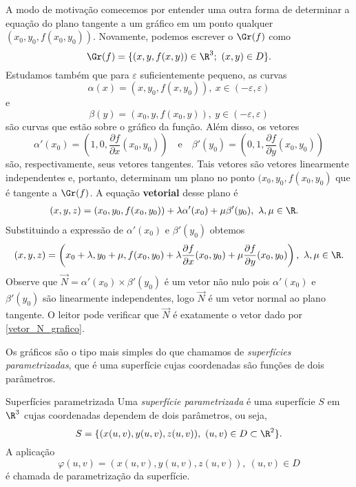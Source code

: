 A modo de motivação comecemos por entender uma outra forma de determinar a equação do plano tangente a um gráfico em um ponto qualquer $(x_0,y_0,f(x_0,y_0))$. Novamente, podemos escrever o $\Gr(f)$ como
$$\Gr(f)=\{(x,y,f(x,y))\in\R^3;~(x,y)\in D\}.$$
Estudamos também que para $\varepsilon$ suficientemente pequeno, as curvas
$$\alpha(x)=(x,y_0,f(x,y_0)),~x\in(-\varepsilon,\varepsilon)$$
e
$$\beta(y)=(x_0,y,f(x_0,y)),~y\in(-\varepsilon,\varepsilon)$$
são curvas que estão sobre o gráfico da função. 
Além disso, os vetores 
$$\alpha'(x_0)=\left(1,0,\dfrac{\partial f}{\partial x}(x_0,y_0)\right) \quad \mbox{e} \quad \beta'(y_0)=\left(0,1,\dfrac{\partial f}{\partial y}(x_0,y_0)\right)$$ 
são, respectivamente, seus vetores tangentes. Tais vetores são vetores linearmente independentes e, portanto, determinam um plano no ponto $(x_0,y_0,f(x_0,y_0)$ que é tangente a $\Gr(f)$. A equação \textbf{vetorial} desse plano é 
\begin{align*}
(x,y,z)&= (x_0,y_0,f(x_0,y_0)) + \lambda \alpha'(x_0)+\mu \beta'(y_0),~\lambda,\mu\in\R.
\end{align*}
Substituindo a expressão de $\alpha'(x_0)$ e $\beta'(y_0)$ obtemos
\begin{equation}\label{eq:vet_plano_tang}
    (x,y,z)=\left(x_0+\lambda,y_0+\mu,f(x_0,y_0) + \lambda \dfrac{\partial f}{\partial x}(x_0,y_0) + \mu\dfrac{\partial f}{\partial y}(x_0,y_0) \right),~\lambda,\mu\in\R.
\end{equation}
Observe que $\vec{N}=\alpha'(x_0) \times \beta'(y_0)$ é um vetor não nulo pois $\alpha'(x_0)$ e $\beta'(y_0)$ são linearmente independentes, logo $\vec{N}$ é um vetor normal ao plano tangente. O leitor pode verificar que $\vec{N}$ é exatamente o vetor dado por \eqref{vetor_N_grafico}. 

Os gráficos são o tipo mais simples do que chamamos de  \textit{superfícies parame\-tri\-zadas}, que é uma superfície cujas coordenadas são funções de dois parâmetros. 

\begin{definition}{Superfícies parametrizada}{}
Uma \textit{superfície parametrizada} é uma superfície $S$ em $\R^3$ cujas coordenadas dependem de dois parâmetros, ou seja, 
$$S=\{(x(u,v),y(u,v),z(u,v)),~(u,v)\in D\subset \R^2\}.$$ 
A aplicação 
\[
\varphi(u, v) = (x(u, v), y(u, v), z(u, v)),~(u,v)\in D 
\]
é chamada de parametrização da superfície. 
\end{definition}

